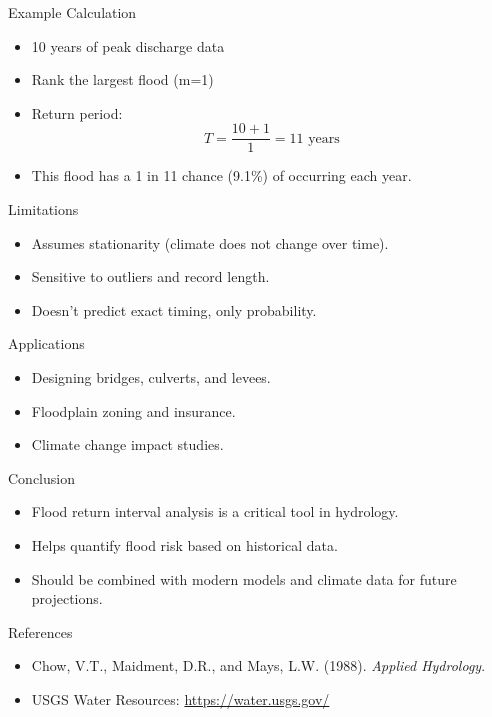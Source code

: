 \documentclass{beamer}
\begin{document}
\begin{frame}{Example Calculation}
    \begin{itemize}
        \item 10 years of peak discharge data
        \item Rank the largest flood (m=1)
        \item Return period: 
        \[
        T = \frac{10 + 1}{1} = 11 \text{ years}
        \]
        \item This flood has a 1 in 11 chance (9.1\%) of occurring each year.
    \end{itemize}
\end{frame}

\begin{frame}{Limitations}
    \begin{itemize}
        \item Assumes stationarity (climate does not change over time).
        \item Sensitive to outliers and record length.
        \item Doesn't predict exact timing, only probability.
    \end{itemize}
\end{frame}

\begin{frame}{Applications}
    \begin{itemize}
        \item Designing bridges, culverts, and levees.
        \item Floodplain zoning and insurance.
        \item Climate change impact studies.
    \end{itemize}
\end{frame}

\begin{frame}{Conclusion}
    \begin{itemize}
        \item Flood return interval analysis is a critical tool in hydrology.
        \item Helps quantify flood risk based on historical data.
        \item Should be combined with modern models and climate data for future projections.
    \end{itemize}
\end{frame}

\begin{frame}{References}
    \begin{itemize}
        \item Chow, V.T., Maidment, D.R., and Mays, L.W. (1988). \textit{Applied Hydrology}.
        \item USGS Water Resources: \url{https://water.usgs.gov/}
    \end{itemize}
\end{frame}
\end{document}

